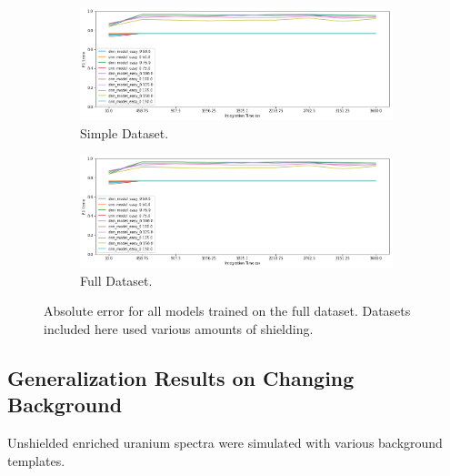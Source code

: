 \begin{figure}[H]
     \centering
     \begin{subfigure}[b]{0.9\textwidth}
         \centering
         \includegraphics[width=\textwidth]{images/results_easy_distance_comparison}
         \caption{Simple Dataset.}
         \label{fig:results_full_background_inject_simple}
     \end{subfigure}

     \begin{subfigure}[b]{0.9\textwidth}
         \centering
         \includegraphics[width=\textwidth]{images/results_easy_distance_comparison}
         \caption{Full Dataset.}
         \label{fig:results_full_background_inject_full}
     \end{subfigure}
        \caption{Absolute error for all models trained on the full dataset. Datasets included here used various amounts of shielding.}
        \label{fig:results_full_background_inject}
\end{figure}


\subsection{Generalization Results on Changing Background}

Unshielded enriched uranium spectra were simulated with various background templates.  


